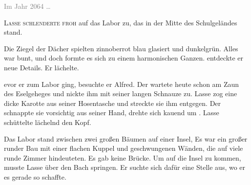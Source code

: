 \label{cha:2064_das_labor}

\textcolor{gray}{Im Jahr 2064 \dots}%

\textsc{Lasse schlenderte froh} auf das Labor zu, das in der Mitte des Schulgeländes stand. 

 Die Ziegel der Dächer spielten  zinnoberrot blau glasiert und dunkelgrün.  Alles war bunt, und doch formte es sich zu einem harmonischen Ganzen.
 entdeckte er  neue Details.
Er lächelte.

evor er zum Labor ging, besuchte er  Alfred.
Der wartete heute schon am Zaun des Eselgeheges und nickte ihm mit seiner langen Schnauze zu.
Lasse zog eine dicke Karotte aus seiner Hosentasche und streckte sie ihm entgegen.
Der schnappte sie vorsichtig aus seiner Hand,  drehte sich kauend  um .
Lasse schüttelte lächelnd den Kopf.

Das Labor stand zwischen zwei großen Bäumen auf einer Insel, 
Es war ein großer runder Bau mit einer flachen Kuppel und  geschwungenen Wänden, die auf viele runde Zimmer  hindeuteten.
Es gab keine Brücke.
Um auf die Insel zu kommen, musste Lasse über den Bach springen.
Er suchte sich dafür eine Stelle aus, wo er es gerade so schaffte.

